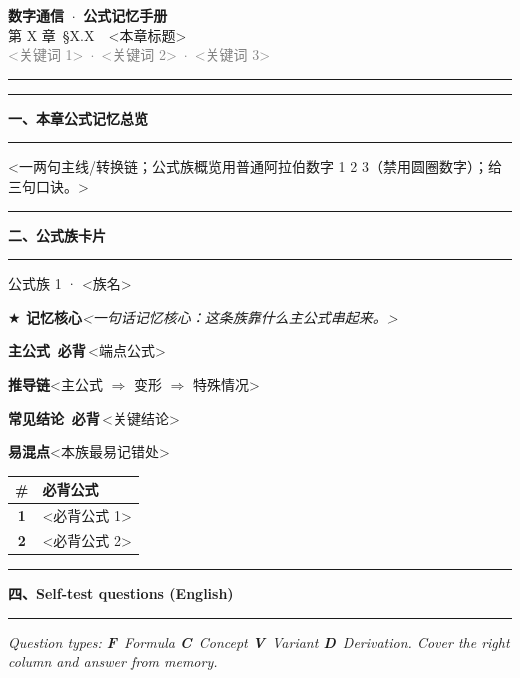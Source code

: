 \documentclass[11pt,a4paper]{ctexart}
\newcommand{\bibei}{\colorbox{red!14}{\textcolor{red!70!black}{\,\scriptsize\bfseries\sffamily 必背\,}}}
\newcommand{\ketui}{\colorbox{blue!14}{\textcolor{blue!55!black}{\,\scriptsize\bfseries\sffamily 可推\,}}}
\newcommand{\gainian}{\colorbox{gray!18}{\textcolor{black!55}{\,\scriptsize\bfseries\sffamily 概念\,}}}
\newcommand{\fld}[2]{\par\noindent\textbf{#1}\quad #2\par\smallskip}
\newcommand{\qF}{\textcolor{blue!55!black}{\textbf{\scriptsize F}}}
\newcommand{\qC}{\textcolor{gray!55!black}{\textbf{\scriptsize C}}}
\newcommand{\qV}{\textcolor{orange!80!black}{\textbf{\scriptsize V}}}
\newcommand{\qD}{\textcolor{green!45!black}{\textbf{\scriptsize D}}}
\newcommand{\secbar}[1]{\par\addvspace{12pt}\noindent
  \textcolor{blue!50!black}{\rule[-2pt]{5pt}{16pt}}\hspace{6pt}%
  {\Large\bfseries\textcolor{blue!35!black}{#1}}\par
  \addvspace{2pt}\noindent\textcolor{blue!20}{\rule{\linewidth}{0.6pt}}\par\addvspace{4pt}}
\newcommand{\core}[1]{\par\noindent
  {\textcolor{orange!75!black}{\textbf{$\bigstar$ 记忆核心}}}\quad\textit{#1}\par\smallskip}
\begin{document}
\begin{center}
{\Huge\bfseries\textcolor{blue!40!black}{数字通信 \,$\cdot$\, 公式记忆手册}}\\[3pt]
{\Large 第 X 章\ \S X.X\ \ <本章标题>}\\[2pt]
{\small\textcolor{gray}{<关键词 1> \,$\cdot$\, <关键词 2> \,$\cdot$\, <关键词 3>}}
\end{center}
\vspace{2pt}
\noindent\textcolor{blue!30}{\rule{\linewidth}{1.2pt}}

\secbar{一、本章公式记忆总览}
<一两句主线/转换链；公式族概览用普通阿拉伯数字 1 2 3（禁用圆圈数字）；给三句口诀。>

\secbar{二、公式族卡片}
\begin{familybox}{公式族 1 · <族名>}
\core{<一句话记忆核心：这条族靠什么主公式串起来。>}
\fld{主公式 \bibei}{<端点公式>}          %
\fld{推导链}{<主公式 $\Rightarrow$ 变形 $\Rightarrow$ 特殊情况>}
\fld{常见结论 \bibei}{<关键结论>}
\fld{易混点}{<本族最易记错处>}
\end{familybox}

\begin{tcolorbox}[enhanced, breakable, sharp corners,
  colback=red!2, colframe=red!55!black, boxrule=0.6pt,
  title={\bfseries\sffamily 三、必背公式极简版},
  colbacktitle=red!60!black, coltitle=white,
  left=10pt, right=10pt, top=4pt, bottom=4pt]
\renewcommand{\arraystretch}{1.45}
\noindent\begin{tabularx}{\linewidth}{@{}>{\bfseries\color{red!60!black}}c X@{}}
\toprule
\rmfamily\color{black}\textbf{\#} & \textbf{必背公式} \\
\midrule
1 & <必背公式 1> \\
2 & <必背公式 2> \\
\bottomrule
\end{tabularx}
\end{tcolorbox}

\secbar{四、Self-test questions (English)}
\noindent\small\textit{Question types: \qF~Formula \quad \qC~Concept \quad \qV~Variant \quad \qD~Derivation. Cover the right column and answer from memory.}\normalsize
\end{document}
